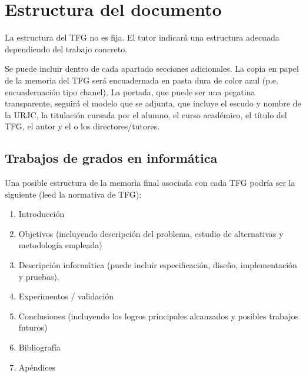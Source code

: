 \section{Estructura del documento}

La estructura del TFG no es fija. El tutor indicará una estructura adecuada dependiendo del trabajo concreto.

Se puede incluir dentro de cada apartado secciones adicionales. La copia en papel de la memoria del TFG será encuadernada en pasta dura de color azul (p.e. encuadernación tipo chanel). La portada, que puede ser una pegatina transparente, seguirá el modelo que se adjunta, que incluye el escudo y nombre de la URJC, la titulación cursada por el alumno, el curso académico, el título del TFG, el autor y el o los directores/tutores.


\subsection{Trabajos de grados en informática}

Una posible estructura de la memoria final asociada con cada TFG podría ser la siguiente (leed la normativa de TFG):
\begin{enumerate}
 \item Introducción
 \item Objetivos (incluyendo descripción del problema, estudio de alternativas y metodología empleada)
 \item Descripción informática (puede incluir especificación, diseño, implementación y pruebas).
 \item Experimentos / validación
 \item Conclusiones (incluyendo los logros principales alcanzados y posibles trabajos futuros)
 \item Bibliografía
 \item Apéndices
\end{enumerate}
